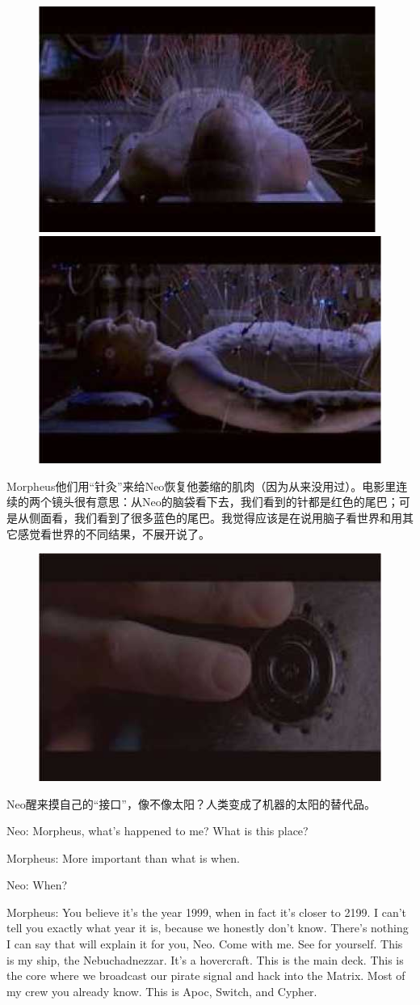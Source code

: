\documentclass[UTF8]{ctexart}
\newenvironment{myquote}{\color{green} \setlength{\leftskip}{6em} \setlength{\rightskip}{4em} \setlength{\parindent}{-2em}}{\par}
\begin{document}
\begin{figure}[htb]
\centering
\includegraphics[width=0.45\linewidth]{fig/read_Matrix-24}
\includegraphics[width=0.45\linewidth]{fig/read_Matrix-25}
\end{figure}

Morpheus他们用“针灸”来给Neo恢复他萎缩的肌肉（因为从来没用过）。电影里连续的两个镜头很有意思：从Neo的脑袋看下去，我们看到的针都是红色的尾巴；可是从侧面看，我们看到了很多蓝色的尾巴。我觉得应该是在说用脑子看世界和用其它感觉看世界的不同结果，不展开说了。

\begin{figure}[htb]
\centering
\includegraphics[width=0.5\linewidth]{fig/read_Matrix-26}
\end{figure}

Neo醒来摸自己的“接口”，像不像太阳？人类变成了机器的太阳的替代品。

\begin{myquote}
Neo: Morpheus, what's happened to me? What is this place?

Morpheus: More important than what is when.

Neo: When?

Morpheus: You believe it's the year 1999, when in fact it's closer to 2199. I can't tell you exactly what year it is, because we honestly don't know. There's nothing I can say that will explain it for you, Neo. Come with me. See for yourself. This is my ship, the Nebuchadnezzar. It's a hovercraft. This is the main deck. This is the core where we broadcast our pirate signal and hack into the Matrix. Most of my crew you already know. This is Apoc, Switch, and Cypher.
\end{myquote}
\end{document}
